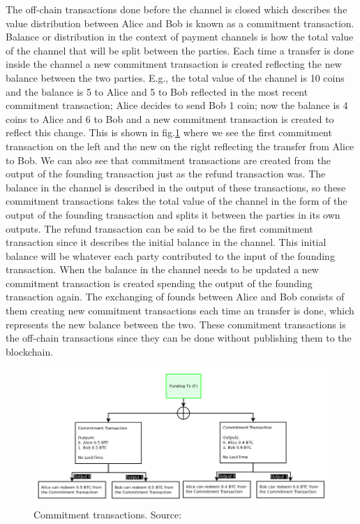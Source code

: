 The off-chain transactions done before the channel is closed which describes the value distribution between Alice and Bob is known as a commitment transaction. Balance or distribution in the context of payment channels is how the total value of the channel that will be split between the parties. Each time a transfer is done inside the channel a new commitment transaction is created reflecting the new balance between the two parties. E.g., the total value of the channel is 10 coins and the balance is 5 to Alice and 5 to Bob reflected in the most recent commitment transaction; Alice decides to send Bob 1 coin; now the balance is 4 coins to Alice and 6 to Bob and a new commitment transaction is created to reflect this change. This is shown in fig.\ref{fig:ln_commit} where we see the first commitment transaction on the left and the new on the right reflecting the transfer from Alice to Bob. We can also see that commitment transactions are created from the output of the founding transaction just as the refund transaction was. The balance in the channel is described in the output of these transactions, so these commitment transactions takes the total value of the channel in the form of the output of the founding transaction and splits it between the parties in its own outputs. The refund transaction can be said to be the first commitment transaction since it describes the initial balance in the channel. This initial balance will be whatever each party contributed to the input of the founding transaction. 
When the balance in the channel needs to be updated a new commitment transaction is created spending the output of the founding transaction again. The exchanging of founds between Alice and Bob consists of them creating new commitment transactions each time an transfer is done, which represents the new balance between the two. These commitment transactions is the off-chain transactions since they can be done without publishing them to the blockchain.


\begin{figure}[h]
    \centering
    \includegraphics[width=12cm]{figures/ln_commit.png}
    \caption{Commitment transactions. Source: \cite{poon2015bitcoin}}
    \label{fig:ln_commit}
\end{figure}

